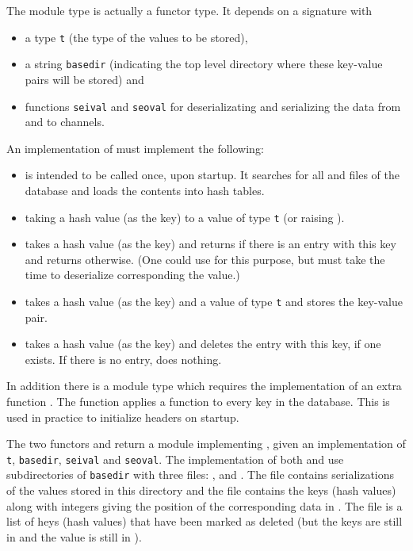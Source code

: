 The module type {} is actually a functor type.
It depends on a signature with
\begin{itemize}
\item a type {\tt{t}} (the type of the values to be stored),
\item a string {\tt{basedir}} (indicating the top level directory where these key-value pairs will be stored) and
\item functions {\tt{seival}} and {\tt{seoval}} for deserializating and serializing the data from and to channels.
\end{itemize}
An implementation of {} must implement the following:
\begin{itemize}
\item {} is intended to be called once, upon startup. It searches for all  and  files of the database and loads the contents into hash tables.
\item {} taking a hash value (as the key) to a value of type {\tt{t}} (or raising {}).
\item {} takes a hash value (as the key) and returns {} if there is an entry with this key and returns {} otherwise. (One could use {} for this purpose, but {} must take the time to deserialize corresponding the value.)
\item {} takes a hash value (as the key) and a value of type {\tt{t}} and stores the key-value pair.
\item {} takes a hash value (as the key) and deletes the entry with this key, if one exists. If there is no entry, {} does nothing.
\end{itemize}
In addition there is a module type {} which requires the implementation of an extra function {}.
The function {} applies a function to every key in the database.
This is used in practice to initialize headers on startup.

The two functors {} and {} return
a module implementing {}, given an implementation of {\tt{t}}, {\tt{basedir}}, {\tt{seival}} and {\tt{seoval}}.
The implementation of both {} and {}
use subdirectories of {\tt{basedir}}
with three files: {},
{}
and {}.
The file {} contains serializations of the values stored in this directory
and the file {} contains the keys (hash values) along with integers giving
the position of the corresponding data in {}.
The file {} is a list of heys (hash values)
that have been marked as deleted (but the keys are still in {}
and the value is still in {}).

